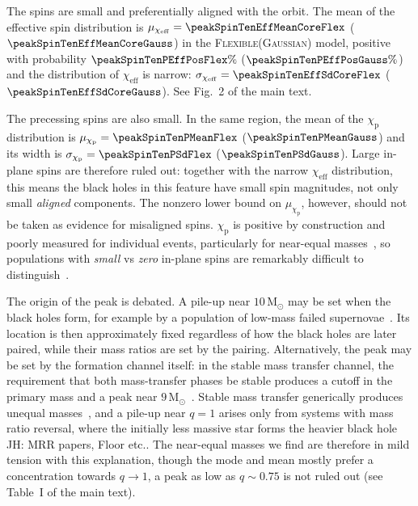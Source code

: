\documentclass[%
 onecolumn,
 amsmath,amssymb,
 aps,
 prl,
 nofootinbib,nobibnotes,
]{revtex4-2}
\newcommand{\Msun}{\ensuremath{\mathrm{M}_{\odot}}}
\newcommand{\chieff}{\ensuremath{\chi_{\mathrm{eff}}}}
\newcommand{\chip}{\ensuremath{\chi_{\mathrm{p}}}}
\newcommand{\jh}[1]{{\color{orange}JH: #1}}
\newcommand{\flexiblespins}{\textsc{Flexible}\xspace}
\newcommand{\gaussianspins}{\textsc{Gaussian}\xspace}
\begin{document}
The spins are small and preferentially aligned with the orbit. The mean of the effective spin distribution is $\mu_{\chieff} = \peakSpinTenEffMeanCoreFlex$ ($\peakSpinTenEffMeanCoreGauss$) in the \flexiblespins (\gaussianspins) model, positive with probability $\peakSpinTenPEffPosFlex\%$ ($\peakSpinTenPEffPosGauss\%$) and the distribution of $\chieff$ is narrow: $\sigma_{\chieff} = \peakSpinTenEffSdCoreFlex$ ($\peakSpinTenEffSdCoreGauss$). See Fig.~2 of the main text.

The precessing spins are also small. In the same region, the mean of the $\chip$ distribution is $\mu_{\chip} = \peakSpinTenPMeanFlex$ ($\peakSpinTenPMeanGauss$) and its width is $\sigma_{\chip} = \peakSpinTenPSdFlex$ ($\peakSpinTenPSdGauss$). Large in-plane spins are therefore ruled out: together with the narrow $\chieff$ distribution, this means the black holes in this feature have small spin magnitudes, not only small \textit{aligned} components. The nonzero lower bound on $\mu_{\chip}$, however, should not be taken as evidence for misaligned spins. $\chip$ is positive by construction and poorly measured for individual events, particularly for near-equal masses~\cite{Apostolatos:1994mx, Green:2020ptm}, so populations with \textit{small} vs \textit{zero} in-plane spins are remarkably difficult to distinguish~\cite[e.g.]{Vitale:2022dpa, Miller:2024sui, Vitale:2025lms}. 


The origin of the peak is debated. A pile-up near $10\,\Msun$ may be set when the black holes form, for example by a population of low-mass failed supernovae~\cite{Schneider:2020vvh, Schneider:2023mxe, Burrows:2024wqv, Legred:2026oiz}. Its location is then approximately fixed regardless of how the black holes are later paired, while their mass ratios are set by the pairing. Alternatively, the peak may be set by the formation channel itself: in the stable mass transfer channel, the requirement that both mass-transfer phases be stable produces a cutoff in the primary mass and a peak near $9\,\Msun$~\cite{vanSon:2022myr}. Stable mass transfer generically produces unequal masses~\cite{vanSon:2022myr, Godfrey:2026pbc}, and a pile-up near $q = 1$ arises only from systems with mass ratio reversal, where the initially less massive star forms the heavier black hole \jh{MRR papers, Floor etc.}. The near-equal masses we find are therefore in mild tension with this explanation, though the mode and mean mostly prefer a concentration towards $q\to1$, a peak as low as $q\sim 0.75$ is not ruled out (see Table~I of the main text). 
\end{document}

